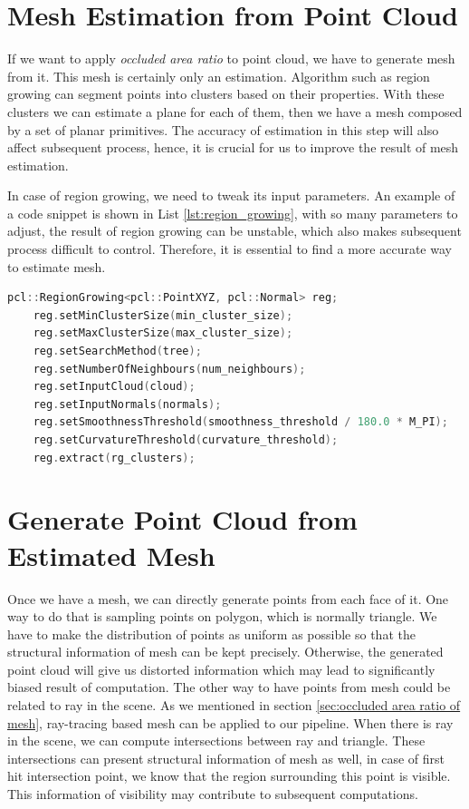 \documentclass[11pt, a4paper,oneside,chapterprefix=false]{scrbook}
\begin{document}
\section{Mesh Estimation from Point Cloud} \label{mesh estimation of point cloud}

If we want to apply \emph{occluded area ratio} to point cloud, we have to generate mesh from it. This mesh is certainly only an estimation. Algorithm such as region growing \cite{pcl_tutorial_2023_rg} can segment points into clusters based on their properties. With these clusters we can estimate a plane for each of them, then we have a mesh composed by a set of planar primitives. The accuracy of estimation in this step will also affect subsequent process, hence, it is crucial for us to improve the result of mesh estimation. 

\vspace{10pt}

In case of region growing, we need to tweak its input parameters. An example of a code snippet is shown in List \ref{lst:region_growing}, with so many parameters to adjust, the result of region growing can be unstable, which also makes subsequent process difficult to control. Therefore, it is essential to find a more accurate way to estimate mesh.   
\begin{lstlisting}[language=C++, caption=Region Growing, label=lst:region_growing]
    pcl::RegionGrowing<pcl::PointXYZ, pcl::Normal> reg;
    reg.setMinClusterSize(min_cluster_size);
    reg.setMaxClusterSize(max_cluster_size);
    reg.setSearchMethod(tree);
    reg.setNumberOfNeighbours(num_neighbours);
    reg.setInputCloud(cloud);
    reg.setInputNormals(normals);
    reg.setSmoothnessThreshold(smoothness_threshold / 180.0 * M_PI);
    reg.setCurvatureThreshold(curvature_threshold);
    reg.extract(rg_clusters);
\end{lstlisting}

\section{Generate Point Cloud from Estimated Mesh} \label{generate point cloud from estimated mesh}

Once we have a mesh, we can directly generate points from each face of it. One way to do that is sampling points on polygon, which is normally triangle. We have to make the distribution of points as uniform as possible so that the structural information of mesh can be kept precisely. Otherwise, the generated point cloud will give us distorted information which may lead to significantly biased result of computation. The other way to have points from mesh could be related to ray in the scene. As we mentioned in section \ref{sec:occluded area ratio of mesh}, ray-tracing based mesh can be applied to our pipeline. When there is ray in the scene, we can compute intersections between ray and triangle. These intersections can present structural information of mesh as well, in case of first hit intersection point, we know that the region surrounding this point is visible. This information of visibility may contribute to subsequent computations. 
\end{document}
